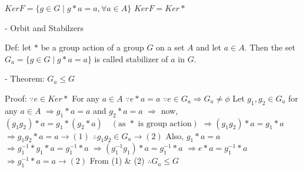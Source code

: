 $Ker F = \{g \in G \mid g * a = a, \forall a \in A\}$
$Ker F = Ker *$

- Orbit and Stabilzers

Def: let $*$ be a group action of a group $G$ on a set $A$ and let $a \in A$. Then the set
$G_a = \{g \in G \mid g * a = a\}$ is called stabilizer of $a$ in $G$.

- Theorem: $G_a \le G$

Proof: $\because e \in Ker*$ For any $a \in A$
$\because e * a = a$
$\because e \in G_a \Rightarrow G_a \neq \phi$
Let $g_1, g_2 \in G_a$ for any $a \in A$
$\Rightarrow g_1 * a = a$ and $g_2 * a = a$
$\Rightarrow$ now, $(g_1 g_2) * a = g_1 * (g_2 * a) \quad (\text{as } * \text{ is group action})$
$\Rightarrow (g_1 g_2) * a = g_1 * a$
$\Rightarrow g_1 g_2 * a = a \longrightarrow (1)$
$\therefore g_1 g_2 \in G_a \longrightarrow (2)$
Also, $g_1 * a = a$
$\Rightarrow g_1^{-1} * g_1 * a = g_1^{-1} * a$
$\Rightarrow (g_1^{-1} g_1) * a = g_1^{-1} * a$
$\Rightarrow e * a = g_1^{-1} * a$
$\Rightarrow g_1^{-1} * a = a \longrightarrow (2)$
From (1) & (2) $\therefore G_a \le G$
